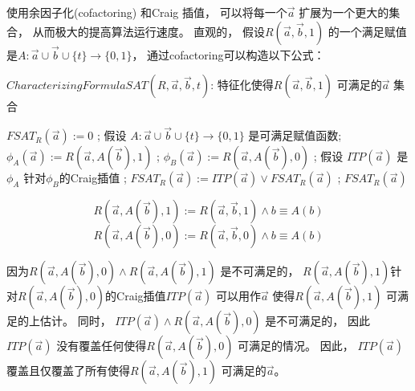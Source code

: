 使用余因子化(cofactoring)  和Craig 插值，
可以将每一个$\vec{a}$ 扩展为一个更大的集合，
从而极大的提高算法运行速度。
直观的，
假设$R(\vec{a},\vec{b},1)$ 的一个满足赋值是$A:\vec{a}\cup\vec{b}\cup\{t\}\to\{0,1\}$，
通过cofactoring可以构造以下公式：

\begin{algorithm}[t]
\caption{$CharacterizingFormulaSAT(R,\vec{a},\vec{b},t)$: 特征化使得$R(\vec{a},\vec{b},1)$ 可满足的$\vec{a}$ 集合}
\label{alg_craigchar}
\begin{algorithmic}[1]
\label{initcondition}
\STATE $FSAT_R(\vec{a}):= 0$ ;
\label{testsat}
  \STATE 假设 $A:\vec{a}\cup\vec{b}\cup\{t\}\rightarrow \{0,1\}$ 是可满足赋值函数;
  \STATE $\phi_A(\vec{a}):= R(\vec{a},A(\vec{b}),1)$ ;
\label{cofact1}
  \STATE $\phi_B(\vec{a}):= R(\vec{a},A(\vec{b}),0)$ ;
\label{cofact2}
  \STATE 假设 $ITP(\vec{a})$ 是$\phi_A$ 针对$\phi_B$的Craig插值 ;
\label{ab}
  \STATE $FSAT_R(\vec{a}):= ITP(\vec{a}) \vee FSAT_R(\vec{a})$ ;
\label{add}
\ENDWHILE
\RETURN $FSAT_R(\vec{a})$
\end{algorithmic}
\end{algorithm}

\begin{equation}
R(\vec{a},A(\vec{b}),1):=R(\vec{a},\vec{b},1)\wedge b\equiv A(b)
\end{equation}
\begin{equation}
R(\vec{a},A(\vec{b}),0):=R(\vec{a},\vec{b},0) \wedge b\equiv A(b)
\end{equation}

因为$R(\vec{a},A(\vec{b}),0)\wedge R(\vec{a},A(\vec{b}),1)$ 是不可满足的，
$R(\vec{a},A(\vec{b}),1)$针对$R(\vec{a},A(\vec{b}),0)$的Craig插值$ITP(\vec{a})$ 可以用作$\vec{a}$ 使得$R(\vec{a},A(\vec{b}),1)$ 可满足的上估计。
同时，
$ITP(\vec{a})\wedge R(\vec{a},A(\vec{b}),0)$ 是不可满足的，
因此$ITP(\vec{a})$ 没有覆盖任何使得$R(\vec{a},A(\vec{b}),0)$ 可满足的情况。
因此，
$ITP(\vec{a})$ 覆盖且仅覆盖了所有使得$R(\vec{a},A(\vec{b}),1)$ 可满足的$\vec{a}$。


